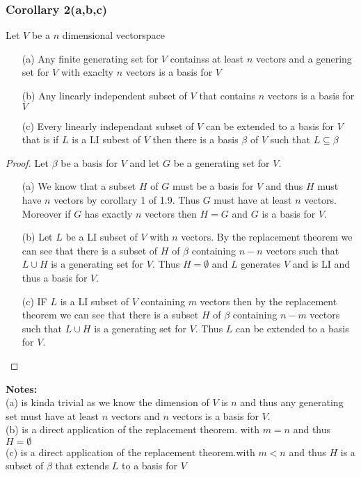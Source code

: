 \documentclass[answers,12pt,addpoints]{exam}
\begin{document}
\subsubsection{Corollary 2(a,b,c)}
Let $V$ be a $n$ dimensional vectorspace
\begin{itemize}
    \item[(a)] Any finite generating set for $V$ containss at least $n$ vectors and a genering set for $V$ with exaclty $n$ vectors is a basis for $V$
    \item[(b)] Any linearly independent subset of $V$ that contains $n$ vectors is a basis for $V$
    \item[(c)] Every linearly independant subset of $V$ can be extended to a basis for $V$ that is if $L$ is a LI subest of $V$ then there is a basis $\beta$ of $ V$ such that $L \subseteq \beta$
\end{itemize}
\begin{proof}
    Let $\beta$ be a basis for $V$ and let $G$ be a generating set for $V$.\\
    \begin{itemize}
        \item[(a)] We know that a subset $H$ of $G$ must be a basis for $V$ and thus $H$ must have $n$ vectors by corollary 1 of 1.9. Thus $G$ must have at least $n$ vectors. Moreover if $G$ has exactly $n$ vectors then $H=G$ and $G$ is a basis for $V$.
        \item[(b)] Let $L$ be a LI subset of $V$ with $n$ vectors. By the replacement theorem we can see that there is a subset of $H$ of $\beta$ containing $n-n$ vectors such that $L \cup H$ is a generating set for $V$. Thus $H = \emptyset$ and $L$ generates $V$ and is LI and thus a basis for $V$.
        \item[(c)] IF $L$ is a LI subset of $V$ containing $m$ vectors then by the replacement theorem we can see that there is a subset $H$ of $\beta$ containing $n-m$ vectors such that $L \cup H$ is a generating set for $V$. Thus $L$ can be extended to a basis for $V$. 
    \end{itemize}
\end{proof}
\textbf{Notes:}\\
(a) is kinda trivial as we know the dimension of $V$ is $n$ and thus any generating set must have at least $n$ vectors and $n$ vectors is a basis for $V$.\\
(b) is a direct application of the replacement theorem. with $m =n$ and thus $H = \emptyset$\\
(c) is a direct application of the replacement theorem.with $m < n$ and thus $H$ is a subset of $\beta$ that extends $L$ to a basis for $V$\\
\end{document}
